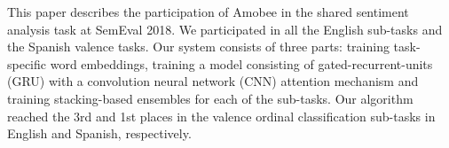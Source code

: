 This paper describes the participation of Amobee in the shared sentiment analysis task at SemEval 2018. We participated in all the English sub-tasks and the Spanish valence tasks. Our system consists of three parts: training task-specific word embeddings, training a model consisting of gated-recurrent-units (GRU) with a convolution neural network (CNN) attention mechanism and training stacking-based ensembles for each of the sub-tasks. Our algorithm reached the 3rd and 1st places in the valence ordinal classification sub-tasks in English and Spanish, respectively.
